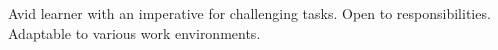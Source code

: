 \documentclass[9pt]{developercv} %
\begin{document}
\vspace{0.5cm}



\begin{minipage}[t]{0.27\textwidth} %
    \vspace{-\baselineskip} %
    Avid learner with an imperative for challenging tasks.
    Open to responsibilities.
    Adaptable to various work environments.
\end{minipage}
\hfill %
\begin{minipage}[t]{0.73\textwidth} %
    \vspace{-\baselineskip} %
    \begin{barchart}{5.5}
    \end{barchart}
\end{minipage}


\end{document}
